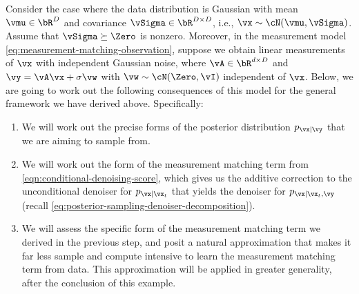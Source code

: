\documentclass[../../book-main.tex]{subfiles}
\begin{document}
\begin{example}\label{example:denoising-conditional-gaussian}
  Consider the case where the data distribution is Gaussian with mean $\vmu \in
  \bR^D$ and
  covariance $\vSigma \in \bR^{D \times D}$, i.e., $\vx \sim \cN(\vmu, \vSigma)$.
  Assume that $\vSigma \succeq \Zero$ is nonzero.
  Moreover, in the measurement model \eqref{eq:measurement-matching-observation},
  suppose we obtain linear measurements of $\vx$ with independent Gaussian
  noise, where $\vA \in \bR^{d \times D}$ and $\vy = \vA \vx + \sigma \vw$
  with $\vw \sim \cN(\Zero, \vI)$ independent of $\vx$.
  Below, we are going to work out the following consequences of this model for
  the general framework we have derived above. Specifically:
  \begin{enumerate}
    \item We will work out the precise forms of the posterior distribution
      $p_{\vx \mid \vy}$ that we are aiming to sample from.
    \item We will work out the form of the measurement matching term from
      \eqref{eqn:conditional-denoising-score}, which gives us the additive
      correction to the unconditional denoiser for $p_{\vx \mid \vx_t}$ that
      yields the denoiser for $p_{\vx \mid \vx_t, \vy}$ (recall
      \eqref{eq:posterior-sampling-denoiser-decomposition}).
    \item We will assess the specific form of the measurement matching term we
      derived in the previous step, and posit a natural approximation that
      makes it far less sample and compute intensive to learn the measurement
      matching term from data. This approximation will be applied in greater
      generality, after the conclusion of this example.
  \end{enumerate}


\end{example}
\end{document}
